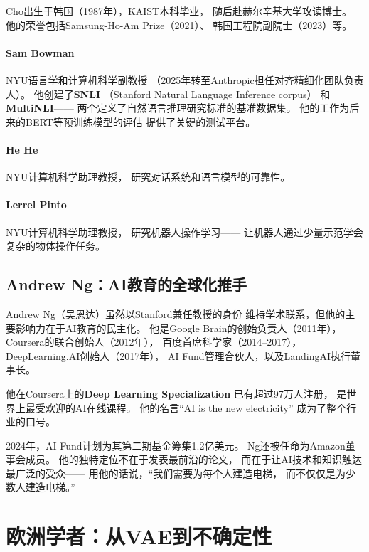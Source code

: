 Cho出生于韩国（1987年），KAIST本科毕业，
随后赴赫尔辛基大学攻读博士。
他的荣誉包括Samsung-Ho-Am Prize（2021）、
韩国工程院副院士（2023）等。

\paragraph{Sam Bowman}
NYU语言学和计算机科学副教授
（2025年转至Anthropic担任对齐精细化团队负责人）。
他创建了\textbf{SNLI}
（Stanford Natural Language Inference corpus）
和\textbf{MultiNLI}——
两个定义了自然语言推理研究标准的基准数据集。
他的工作为后来的BERT等预训练模型的评估
提供了关键的测试平台。

\paragraph{He He}
NYU计算机科学助理教授，
研究对话系统和语言模型的可靠性。

\paragraph{Lerrel Pinto}
NYU计算机科学助理教授，
研究机器人操作学习——
让机器人通过少量示范学会复杂的物体操作任务。

\subsection{Andrew Ng：AI教育的全球化推手}

Andrew Ng（吴恩达）虽然以Stanford兼任教授的身份
维持学术联系，但他的主要影响力在于AI教育的民主化。
他是Google Brain的创始负责人（2011年），
Coursera的联合创始人（2012年），
百度首席科学家（2014--2017），
DeepLearning.AI创始人（2017年），
AI Fund管理合伙人，以及LandingAI执行董事长。

他在Coursera上的\textbf{Deep Learning Specialization}
已有超过97万人注册，
是世界上最受欢迎的AI在线课程。
他的名言``AI is the new electricity''
成为了整个行业的口号。

2024年，AI Fund计划为其第二期基金筹集1.2亿美元。
Ng还被任命为Amazon董事会成员。
他的独特定位不在于发表最前沿的论文，
而在于让AI技术和知识触达最广泛的受众——
用他的话说，``我们需要为每个人建造电梯，
而不仅仅是为少数人建造电梯。''


\section{欧洲学者：从VAE到不确定性}
\label{sec:europe}

